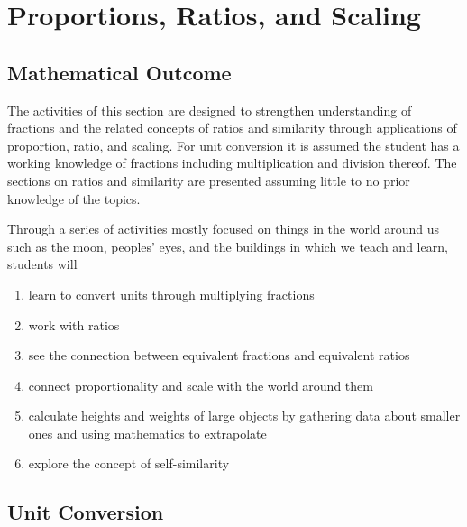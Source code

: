 %
\chapter{Proportions, Ratios, and Scaling}\label{chap:proportions}
%

\setcounter{section}{-1}
\section{Mathematical Outcome}\label{sec:RatiosOutcome}
The activities of this section are designed to strengthen understanding of fractions and the related concepts of ratios and similarity through applications of proportion, ratio, and scaling. For unit conversion it is assumed the student has a working knowledge of fractions including multiplication and division thereof. The sections on ratios and similarity are presented assuming little to no prior knowledge of the topics.

Through a series of activities mostly focused on things in the world around us such as the moon, peoples' eyes, and the buildings in which we teach and learn, students will
\begin{enumerate}
\item learn to convert units through multiplying fractions
\item work with ratios
\item see the connection between equivalent fractions and equivalent ratios
\item connect proportionality and scale with the world around them
\item calculate heights and weights of large objects by gathering data about smaller ones and using mathematics to extrapolate
\item explore the concept of self-similarity
\end{enumerate}

\newpage
\section{Unit Conversion}\label{sec:Conversion}

